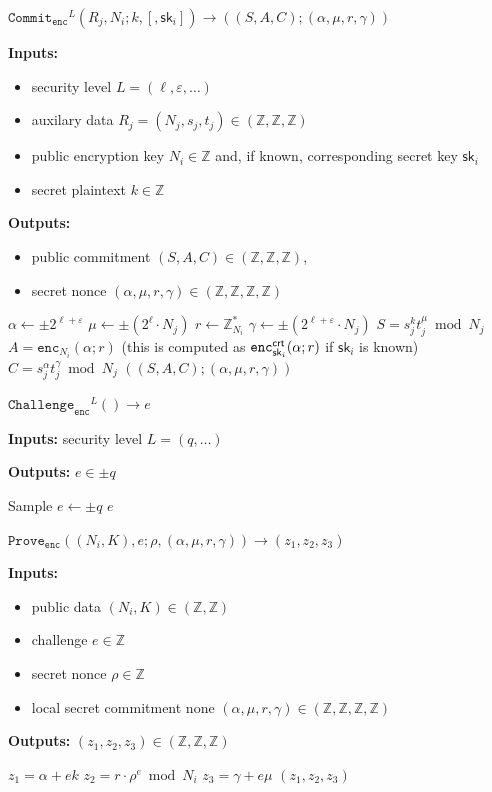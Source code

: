 \documentclass[11pt]{article}
\def\crt{{\sf crt}}
\newenvironment{inlineAlgorithm}{}{}
\newcommand{\algoName}[1]{#1 \par}
\newcommand{\algoInputs}[1]{
    {\small \bf Inputs:} #1 \par
}
\newcommand{\algoInputsList}[1]{
    {\small \bf Inputs:} 
        \begin{itemize}[noitemsep,topsep=0pt]
            #1
        \end{itemize}
}
\newcommand{\algoOutputs}[1]{
    {\small \bf Outputs:} #1 \par
}
\newcommand{\algoOutputsList}[1]{
    {\small \bf Outputs:}
        \begin{itemize}[noitemsep,topsep=0pt]
            #1
        \end{itemize}
}
\newcommand{\enc}{\ensuremath{\mathtt{enc}}}
\newcommand{\commit}[1]{\ensuremath{\mathtt{Commit}_{\mathtt{#1}}}}
\newcommand{\challenge}[1]{\ensuremath{\mathtt{Challenge}_{\mathtt{#1}}}}
\newcommand{\prove}[1]{\ensuremath{\mathtt{Prove}_{\mathtt{#1}}}}
\newcommand{\sk}{\textsf{sk}}
\newcommand{\Z}{\mathbb{Z}}
\newcommand{\?}[1]{\stackrel{?}{#1}}
\begin{document}
\begin{description}

\item
\begin{inlineAlgorithm}
\algoName{$\commit{enc}^L(R_j, N_i; k, [, \sk_i]) \to ((S, A, C); (\alpha, \mu, r, \gamma))$}
\algoInputsList{
    \item security level $L = (\ell, \varepsilon, \dots)$
    \item auxilary data $R_j = (N_j, s_j, t_j) \in (\Z, \Z, \Z)$
    \item public encryption key $N_i \in \Z$ and, if known, corresponding secret key $\sk_i$
    \item secret plaintext $k \in \Z$
}
\algoOutputsList{
    \item public commitment $(S, A, C) \in (\Z, \Z, \Z)$,
    \item secret nonce $(\alpha, \mu, r, \gamma) \in (\Z, \Z, \Z, \Z)$
}
\begin{algorithmic}[1]
\State $\alpha \gets \pm 2^{\ell + \varepsilon}$
\State $\mu \gets \pm (2^\ell \cdot N_j)$
\State $r \gets \Z_{N_i}^*$
\State $\gamma \gets \pm (2^{\ell + \varepsilon} \cdot N_j)$
\Statex
\State $S = s_j^k t_j^\mu \bmod N_j$ 
\State $A = \enc_{N_i}(\alpha; r)$  (this is computed as $\enc^\crt_{\sk_i}(\alpha; r)$ if $\sk_i$ is known)
\State $C = s_j^\alpha t_j^\gamma \bmod N_j$ 
\State \Return $((S, A, C); (\alpha, \mu, r, \gamma))$
\end{algorithmic}
\end{inlineAlgorithm}

\item
\begin{inlineAlgorithm}
\algoName{$\challenge{enc}^L() \to e$}
\algoInputs{security level $L = (q, \dots)$}
\algoOutputs{$e \in \pm q$}
\begin{algorithmic}[1]
\State Sample $e \gets \pm q$
\State \Return $e$
\end{algorithmic}

\item
\begin{inlineAlgorithm}
\algoName{$\prove{enc}((N_i, K), e; \rho, (\alpha, \mu, r, \gamma)) \to (z_1, z_2, z_3)$}
\algoInputsList{
    \item public data $(N_i, K) \in (\Z, \Z)$
    \item challenge $e \in \Z$
    \item secret nonce $\rho \in \Z$
    \item local secret commitment none $(\alpha, \mu, r, \gamma) \in (\Z, \Z, \Z, \Z)$
}
\algoOutputs{$(z_1, z_2, z_3) \in (\Z, \Z, \Z)$}
\begin{algorithmic}[1]
\State $z_1 = \alpha + e k $
\State $z_2 = r \cdot \rho^e \bmod N_i $
\State $z_3 = \gamma + e \mu$
\State \Return $(z_1, z_2, z_3)$
\end{algorithmic}
\end{inlineAlgorithm}
\end{inlineAlgorithm}


\end{description}
\end{document}
